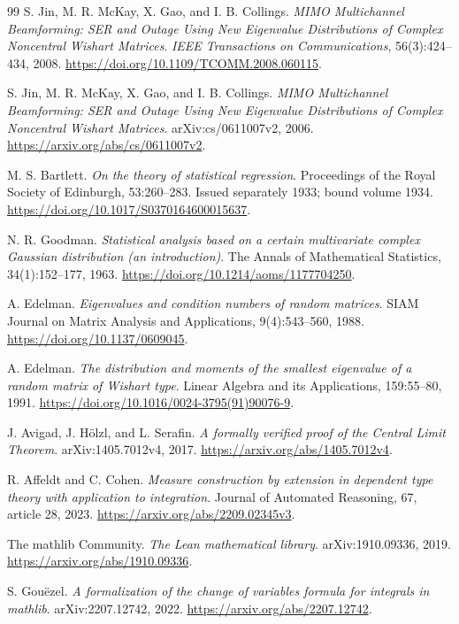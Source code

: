 \documentclass[11pt]{article}
\begin{document}
\begin{thebibliography}{99}
S. Jin, M. R. McKay, X. Gao, and I. B. Collings.
\emph{MIMO Multichannel Beamforming: SER and Outage Using New Eigenvalue
Distributions of Complex Noncentral Wishart Matrices}.
\emph{IEEE Transactions on Communications}, 56(3):424--434, 2008.
\url{https://doi.org/10.1109/TCOMM.2008.060115}.

S. Jin, M. R. McKay, X. Gao, and I. B. Collings.
\emph{MIMO Multichannel Beamforming: SER and Outage Using New Eigenvalue
Distributions of Complex Noncentral Wishart Matrices}.
arXiv:cs/0611007v2, 2006.
\url{https://arxiv.org/abs/cs/0611007v2}.

M. S. Bartlett. \emph{On the theory of statistical regression}.
Proceedings of the Royal Society of Edinburgh, 53:260--283.
Issued separately 1933; bound volume 1934.
\url{https://doi.org/10.1017/S0370164600015637}.

N. R. Goodman. \emph{Statistical analysis based on a certain multivariate
complex Gaussian distribution (an introduction)}.
The Annals of Mathematical Statistics, 34(1):152--177, 1963.
\url{https://doi.org/10.1214/aoms/1177704250}.

A. Edelman. \emph{Eigenvalues and condition numbers of random matrices}.
SIAM Journal on Matrix Analysis and Applications, 9(4):543--560, 1988.
\url{https://doi.org/10.1137/0609045}.

A. Edelman. \emph{The distribution and moments of the smallest eigenvalue
of a random matrix of Wishart type}.
Linear Algebra and its Applications, 159:55--80, 1991.
\url{https://doi.org/10.1016/0024-3795(91)90076-9}.

J. Avigad, J. H\"olzl, and L. Serafin.
\emph{A formally verified proof of the Central Limit Theorem}.
arXiv:1405.7012v4, 2017.
\url{https://arxiv.org/abs/1405.7012v4}.

R. Affeldt and C. Cohen.
\emph{Measure construction by extension in dependent type theory with
application to integration}.
Journal of Automated Reasoning, 67, article 28, 2023.
\url{https://arxiv.org/abs/2209.02345v3}.

The mathlib Community.
\emph{The Lean mathematical library}.
arXiv:1910.09336, 2019.
\url{https://arxiv.org/abs/1910.09336}.

S. Gou\"ezel.
\emph{A formalization of the change of variables formula for integrals in mathlib}.
arXiv:2207.12742, 2022.
\url{https://arxiv.org/abs/2207.12742}.


\end{thebibliography}
\end{document}
